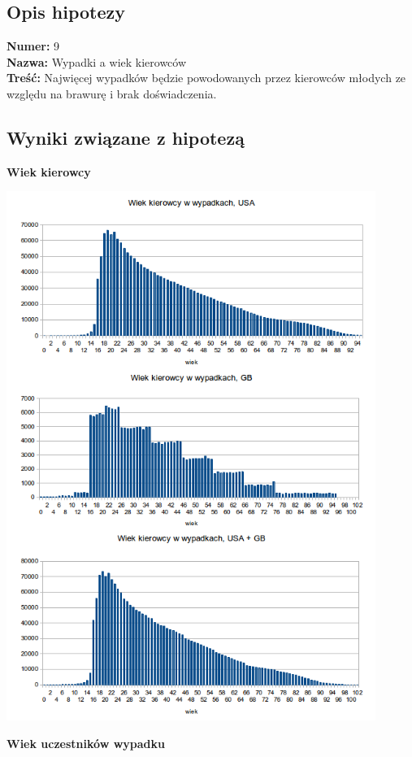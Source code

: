 \subsection{Opis hipotezy}\label{opis-hipotezy}

\textbf{Numer:} 9\\\textbf{Nazwa:} Wypadki a wiek
kierowców\\\textbf{Treść:} Najwięcej wypadków będzie powodowanych przez
kierowców młodych ze względu na brawurę i brak doświadczenia.

\subsection{Wyniki związane z
hipotezą}\label{wyniki-zwiazane-z-hipoteza}

\textbf{Wiek kierowcy}

\includegraphics[width=0.9\textwidth]{images/statistics/driver_age.png}

\textbf{Wiek uczestników wypadku}

